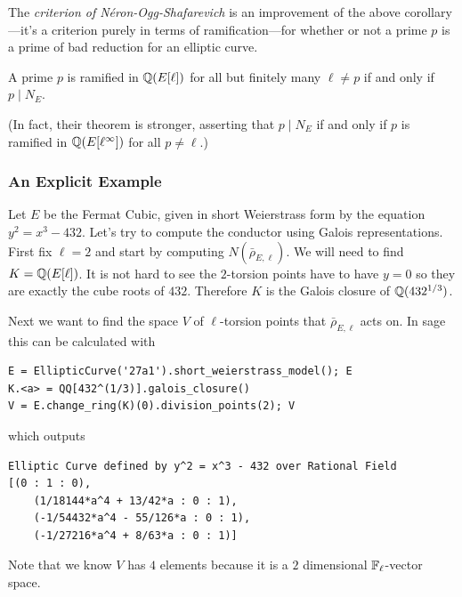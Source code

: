 \documentclass{book}
\begin{document}
The {\em criterion of N\'eron-Ogg-Shafarevich} is an improvement
of the above corollary---it's a criterion purely
in terms of ramification---for whether or not a prime
$p$ is a prime of bad reduction for an elliptic curve.
\begin{theorem}
A prime $p$ is ramified in $\mathbb{Q}(E[\ell])$ for all but
finitely many $\ell\neq p$ if and only if $p\mid N_E$.
\end{theorem}
(In fact, their theorem is stronger, asserting that $p\mid N_E$
if and only if $p$ is ramified in $\mathbb{Q}(E[\ell^\infty])$ for
all $p\neq \ell$.)

\subsubsection{An Explicit Example}
Let $E$ be the Fermat Cubic, given in short Weierstrass
form by the equation $y^2 = x^3 - 432$. Let's try to
compute the conductor using Galois representations.
First fix $\ell=2$ and start by computing
$N(\bar{\rho}_{E,\ell})$. We will need to find $K =
\mathbb{Q}(E[\ell])$. It is not hard to see the $2$-torsion points
have to have $y=0$ so they are exactly the cube roots of
$432$. Therefore $K$ is the Galois closure of
$\mathbb{Q}(432^{1/3})$.

Next we want to find the space $V$ of $\ell$-torsion points that $\bar{\rho}_{E,\ell}$ acts on. In sage this can be calculated with
	\begin{lstlisting}
E = EllipticCurve('27a1').short_weierstrass_model(); E
K.<a> = QQ[432^(1/3)].galois_closure()
V = E.change_ring(K)(0).division_points(2); V
	\end{lstlisting}
	which outputs
	\begin{lstlisting}
Elliptic Curve defined by y^2 = x^3 - 432 over Rational Field
[(0 : 1 : 0),
    (1/18144*a^4 + 13/42*a : 0 : 1),
    (-1/54432*a^4 - 55/126*a : 0 : 1),
    (-1/27216*a^4 + 8/63*a : 0 : 1)]
	\end{lstlisting}
	Note that we know $V$ has $4$ elements because it is a $2$ dimensional $\mathbb{F}_\ell$-vector space.
\end{document}
